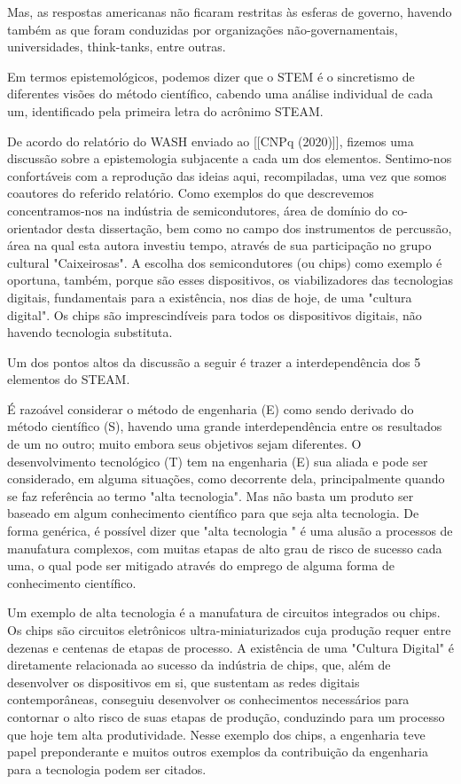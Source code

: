 Mas, as respostas americanas não ficaram restritas às esferas de governo, havendo também as que foram conduzidas por organizações não-governamentais, universidades, think-tanks, entre outras.

Em termos epistemológicos, podemos dizer que o STEM é o sincretismo de diferentes visões do método científico, cabendo uma análise individual de cada um, identificado pela primeira letra do acrônimo STEAM.

De acordo do relatório do WASH enviado ao [[CNPq (2020)]], fizemos uma discussão sobre a epistemologia subjacente a cada um dos elementos. Sentimo-nos confortáveis com a reprodução das ideias aqui, recompiladas, uma vez que somos coautores do referido relatório. Como exemplos do que descrevemos concentramos-nos na indústria de semicondutores, área de domínio do co-orientador desta dissertação, bem como no campo dos instrumentos de percussão, área na qual esta autora investiu tempo, através de sua participação no grupo cultural "Caixeirosas". A escolha dos semicondutores (ou chips) como exemplo é oportuna, também, porque são esses dispositivos, os viabilizadores das tecnologias digitais, fundamentais para a existência, nos dias de hoje, de uma "cultura digital". Os chips são imprescindíveis para todos os dispositivos digitais, não havendo tecnologia substituta.

Um dos pontos altos da discussão a seguir é trazer a interdependência dos 5 elementos do STEAM.

É razoável considerar o método de engenharia (E) como sendo derivado do método científico (S), havendo uma grande interdependência entre os resultados de um no outro; muito embora seus objetivos sejam diferentes. O desenvolvimento tecnológico (T) tem na engenharia (E) sua aliada e pode ser considerado, em alguma situações, como decorrente dela, principalmente quando se faz referência ao termo "alta tecnologia". Mas não basta um produto ser baseado em algum conhecimento científico para que seja alta tecnologia. De forma genérica, é possível dizer que "alta tecnologia " é uma alusão a processos de manufatura complexos, com muitas etapas de alto grau de risco de sucesso cada uma, o qual pode ser mitigado através do emprego de alguma forma de conhecimento científico.

Um exemplo de alta tecnologia é a manufatura de circuitos integrados ou chips. Os chips são circuitos eletrônicos ultra-miniaturizados cuja produção requer entre dezenas e centenas de etapas de processo. A existência de uma "Cultura Digital" é diretamente relacionada ao sucesso da indústria de chips, que, além de desenvolver os dispositivos em si, que sustentam as redes digitais contemporâneas, conseguiu desenvolver os conhecimentos necessários para contornar o alto risco de suas etapas de produção, conduzindo para um processo que hoje tem alta produtividade. Nesse exemplo dos chips, a engenharia teve papel preponderante e muitos outros exemplos da contribuição da engenharia para a tecnologia podem ser citados.

